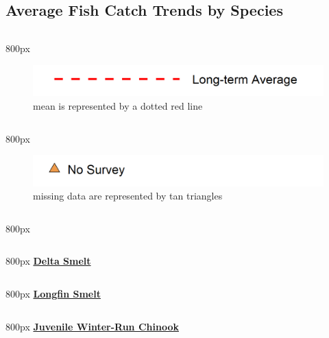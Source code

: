 \documentclass[
]{book}
\begin{document}
\hypertarget{average-fish-catch-trends-by-species-6}{%
\subsection{Average Fish Catch Trends by Species}\label{average-fish-catch-trends-by-species-6}}

\begin{column}{800px\textwidth}
\begin{figure}
\includegraphics[width=15.25in]{figures/mline} \caption{mean is represented by a dotted red line}\label{fig:unnamed-chunk-177}
\end{figure}
\end{column}

\begin{column}{800px\textwidth}
\begin{figure}
\includegraphics[width=15.25in]{figures/mpoint} \caption{missing data are represented by tan triangles}\label{fig:unnamed-chunk-178}
\end{figure}
\end{column}

\begin{column}{800px\textwidth}
\end{column}

\begin{column}{800px\textwidth}
\textbf{\href{http://calfish.ucdavis.edu/species/?uid=47\&ds=698}{Delta Smelt}}
\end{column}

\begin{column}{800px\textwidth}
\textbf{\href{http://calfish.ucdavis.edu/species/?uid=87\&ds=698}{Longfin Smelt}}
\end{column}

\begin{column}{800px\textwidth}
\textbf{\href{http://calfish.ucdavis.edu/species/?uid=30\&ds=698}{Juvenile Winter-Run Chinook}}
\end{column}
\end{document}
